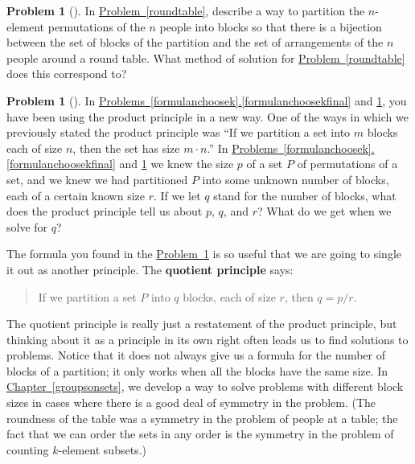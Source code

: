 \documentclass[10pt,]{book}
\newcommand{\terminology}[1]{\textbf{#1}}
\theoremstyle{plain}
\theoremstyle{definition}
\newtheorem{activity}[project]{Problem}
\theoremstyle{definition}
\numberwithin{equation}{chapter}
\begin{document}
\begin{activity}[] \label{roundtablepartition}
In \hyperref[roundtable]{Problem~\ref{roundtable}}, describe a way to partition the \(n\)-element permutations of the \(n\) people into blocks so that there is a bijection between the set of blocks of the partition and the set of arrangements of the \(n\) people around a round table. What method of solution for \hyperref[roundtable]{Problem~\ref{roundtable}} does this correspond to?%
\end{activity}
\begin{activity}[] \label{quotientprinciple}
In \hyperref[formulanchoosekfinal]{Problems~\ref{formulanchoosek}.\ref{formulanchoosekfinal}} and \hyperref[roundtablepartition]{\ref{roundtablepartition}}, you have been using the product principle in a new way. One of the ways in which we previously stated the product principle was ``If we partition a set into \(m\) blocks each of size \(n\), then the set has size \(m\cdot n\).'' In \hyperref[formulanchoosekfinal]{Problems~\ref{formulanchoosek}.\ref{formulanchoosekfinal}} and \hyperref[roundtablepartition]{\ref{roundtablepartition}} we knew the size \(p\) of a set \(P\) of permutations of a set, and we knew we had partitioned \(P\) into some unknown number of blocks, each of a certain known size \(r\). If we let \(q\) stand for the number of blocks, what does the product principle tell us about \(p\), \(q\), and \(r\)? What do we get when we solve for \(q\)?%
\end{activity}
The formula you found in the \hyperref[quotientprinciple]{Problem~\ref{quotientprinciple}} is so useful that we are going to single it out as another principle. The \terminology{quotient principle} says:%
\begin{quote}\hypertarget{blockquote-4}{}
If we partition a set \(P\) into \(q\) blocks, each of size \(r\), then \(q=p/r.\)%
\end{quote}
The quotient principle is really just a restatement of the product principle, but thinking about it as a principle in its own right often leads us to find solutions to problems. Notice that it does not always give us a formula for the number of blocks of a partition; it only works when all the blocks have the same size. In \hyperref[groupsonsets]{Chapter~\ref{groupsonsets}}, we develop a way to solve problems with different block sizes in cases where there is a good deal of symmetry in the problem. (The roundness of the table was a symmetry in the problem of people at a table; the fact that we can order the sets in any order is the symmetry in the problem of counting \(k\)-element subsets.)%
\end{document}
